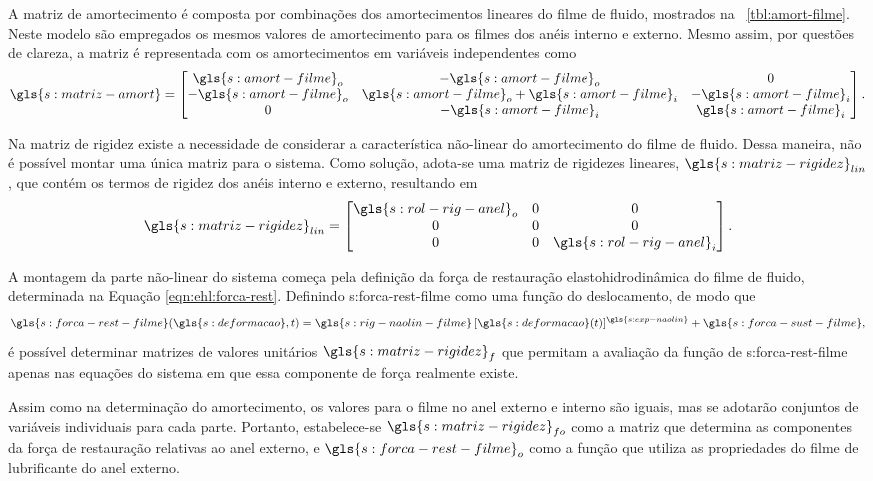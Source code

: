 \documentclass[12pt,oneside,english,brazil,lmodern,siglas,simbolos,cite=num]{ucsmonograph}
\begin{document}
	A matriz de amortecimento é composta por combinações dos amortecimentos lineares do filme de fluido, mostrados na \tablename\ \ref{tbl:amort-filme}.
	Neste modelo são empregados os mesmos valores de amortecimento para os filmes dos anéis interno e externo.
	Mesmo assim, por questões de clareza, a matriz é representada com os amortecimentos em variáveis independentes como
	\begin{equation*}
		\gls{s:matriz-amort} = 
	\begin{bmatrix}
		\gls{s:amort-filme}_o & -\gls{s:amort-filme}_o & 0\\
		-\gls{s:amort-filme}_o & \gls{s:amort-filme}_o +
		\gls{s:amort-filme}_i & -\gls{s:amort-filme}_i\\
		0 & -\gls{s:amort-filme}_i & \gls{s:amort-filme}_i
	\end{bmatrix}.
	\end{equation*}
	
	Na matriz de rigidez existe a necessidade de considerar a característica não-linear do amortecimento do filme de fluido.
	Dessa maneira, não é possível montar uma única matriz para o sistema.
	Como solução, adota-se uma matriz de rigidezes lineares, $\gls{s:matriz-rigidez}_{lin}$, que contém os termos de rigidez dos anéis interno e externo, resultando em
	\begin{equation*}
		\gls{s:matriz-rigidez}_{lin} =
	\begin{bmatrix}
		\gls{s:rol-rig-anel}_o	&	0	&	0\\
		0	&	0	&	0\\
		0	&	0	&	\gls{s:rol-rig-anel}_i
	\end{bmatrix}.
	\end{equation*}
	
	A montagem da parte não-linear do sistema começa pela definição da força de restauração elastohidrodinâmica do filme de fluido, determinada na Equação \ref{eqn:ehl:forca-rest}.
	Definindo \gls{s:forca-rest-filme} como uma função do deslocamento, de modo que
	\begin{equation*}
		\gls{s:forca-rest-filme}(\gls{s:deformacao},t) =
		\gls{s:rig-naolin-filme}\,[\gls{s:deformacao}(t)]^{
		\gls{s:exp-naolin}} + \gls{s:forca-sust-filme},
	\end{equation*}
	é possível determinar matrizes de valores unitários $\gls{s:matriz-rigidez}_f$ que permitam a avaliação da função de \gls{s:forca-rest-filme} apenas nas equações do sistema em que essa componente de força realmente existe.
	
	Assim como na determinação do amortecimento, os valores para o filme no anel externo e interno são iguais, mas se adotarão conjuntos de variáveis individuais para cada parte.
	Portanto, estabelece-se $\gls{s:matriz-rigidez}_{fo}$ como a matriz que determina as componentes da força de restauração relativas ao anel externo, e $\gls{s:forca-rest-filme}_o$ como a função que utiliza as propriedades do filme de lubrificante do anel externo.
	
\end{document}
